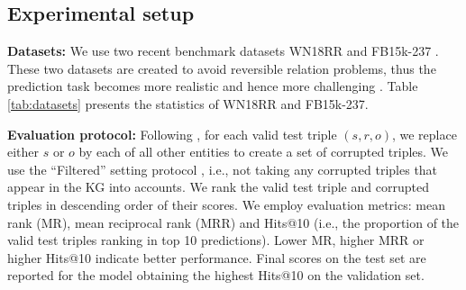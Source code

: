 \documentclass[11pt,a4paper]{article}
\begin{document}
\subsection{Experimental setup} 
\noindent\textbf{Datasets:} 
We use two recent benchmark datasets WN18RR \citep{Dettmers2017} and FB15k-237 \citep{toutanova-chen:2015:CVSC}. These two datasets are created to avoid  reversible relation problems, thus the prediction task becomes more realistic and hence more challenging \citep{toutanova-chen:2015:CVSC}.
Table \ref{tab:datasets} presents the statistics of WN18RR and FB15k-237.

\begin{table}[!htb]
\centering
{}
\caption{Statistics of the experimental  datasets. \#E is the number of entities. \#R is the number of relations.}
\label{tab:datasets}
\end{table}

\noindent\textbf{Evaluation protocol:}
Following \citet{NIPS2013_5071}, for each valid test triple $(s, r, o)$, we replace either $s$ or $o$ by each of all other entities to create a set of corrupted triples.
We use the ``{Filtered}'' setting protocol \citep{NIPS2013_5071}, i.e., not taking  any corrupted triples that appear in the KG into accounts.
We rank the valid test triple and corrupted triples in descending order of their scores.
We employ evaluation metrics: mean rank (MR), mean reciprocal rank (MRR) and Hits@10 (i.e., the proportion of the valid test triples ranking in top {10} predictions).
Lower MR, higher MRR or higher Hits@{10} indicate better performance. Final scores on the test set are reported for the model obtaining the
highest Hits@10 on the validation set.
\end{document}
